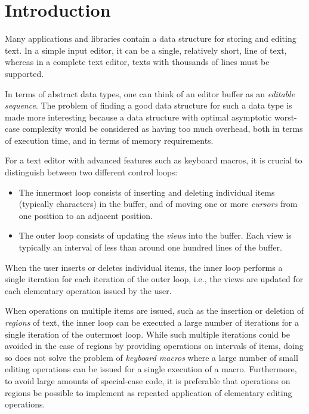 \section{Introduction}
\label{sec-introduction}

Many applications and libraries contain a data structure for storing
and editing text.  In a simple input editor, it can be a single,
relatively short, line of text, whereas in a complete text editor,
texts with thousands of lines must be supported.

In terms of abstract data types, one can think of an editor buffer as
an \emph{editable sequence}.  The problem of finding a good data
structure for such a data type is made more interesting because a data
structure with optimal asymptotic worst-case complexity would be
considered as having too much overhead, both in terms of execution
time, and in terms of memory requirements.

For a text editor with advanced features such as keyboard macros, it
is crucial to distinguish between two different control loops:

\begin{itemize}
\item The innermost loop consists of inserting and deleting individual
  items (typically characters) in the buffer, and of moving one or
  more \emph{cursors} from one position to an adjacent position.
\item The outer loop consists of updating the \emph{views} into the
  buffer.  Each view is typically an interval of less than around one
  hundred lines of the buffer.
\end{itemize}

When the user inserts or deletes individual items, the inner loop
performs a single iteration for each iteration of the outer loop,
i.e., the views are updated for each elementary operation issued by
the user.

When operations on multiple items are issued, such as the insertion or
deletion of \emph{regions} of text, the inner loop can be executed a
large number of iterations for a single iteration of the outermost
loop.  While such multiple iterations could be avoided in the case of
regions by providing operations on intervals of items, doing so does
not solve the problem of \emph{keyboard macros} where a large number
of small editing operations can be issued for a single execution of a
macro.  Furthermore, to avoid large amounts of special-case code, it
is preferable that operations on regions be possible to implement as
repeated application of elementary editing operations.

